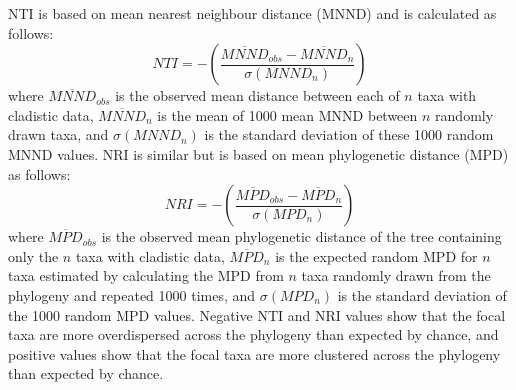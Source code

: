 \documentclass[12pt,letterpaper]{article}
\begin{document}
NTI \citep{webb2002phylogenies} is based on mean nearest neighbour distance (MNND) and is calculated as follows:
  \begin{equation}
    NTI=-\left(\frac{\overline{MNND}_{obs}-\overline{MNND}_{n}}{\sigma(MNND_{n})}\right)
  \end{equation}
where $\overline{MNND}_{obs}$ is the observed mean distance between each of $n$ taxa with cladistic data, $\overline{MNND}_{n}$ is the mean of 1000 mean MNND between $n$ randomly drawn taxa, and $\sigma(MNND_{n})$ is the standard deviation of these 1000 random MNND values.
NRI is similar but is based on mean phylogenetic distance (MPD) as follows:
  \begin{equation}
    NRI=-\left(\frac{\overline{MPD}_{obs}-\overline{MPD}_{n}}{\sigma(MPD_{n})}\right)
  \end{equation}
where $\overline{MPD}_{obs}$ is the observed mean phylogenetic distance of the tree containing only the $n$ taxa with cladistic data, $\overline{MPD}_{n}$ is the expected random MPD for $n$ taxa estimated by calculating the MPD from $n$ taxa randomly drawn from the phylogeny and repeated 1000 times, and $\sigma(MPD_{n})$ is the standard deviation of the 1000 random MPD values.
Negative NTI and NRI values show that the focal taxa are more overdispersed across the phylogeny than expected by chance, and positive values show that the focal taxa are more clustered across the phylogeny than expected by chance.
\end{document}
